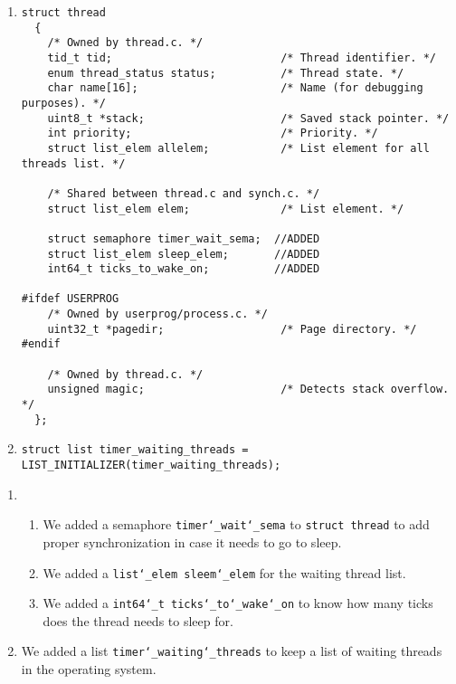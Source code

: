 \documentclass{article}
\renewcommand{\_}{\char`_}
\begin{document}
\begin{enumerate}
 \item \begin{lstlisting}
struct thread
  {
    /* Owned by thread.c. */
    tid_t tid;                          /* Thread identifier. */
    enum thread_status status;          /* Thread state. */
    char name[16];                      /* Name (for debugging purposes). */
    uint8_t *stack;                     /* Saved stack pointer. */
    int priority;                       /* Priority. */
    struct list_elem allelem;           /* List element for all threads list. */

    /* Shared between thread.c and synch.c. */
    struct list_elem elem;              /* List element. */

    struct semaphore timer_wait_sema;  //ADDED
    struct list_elem sleep_elem;       //ADDED 
    int64_t ticks_to_wake_on;          //ADDED 

#ifdef USERPROG
    /* Owned by userprog/process.c. */
    uint32_t *pagedir;                  /* Page directory. */
#endif

    /* Owned by thread.c. */
    unsigned magic;                     /* Detects stack overflow. */
  };
\end{lstlisting}

\item \begin{lstlisting}
struct list timer_waiting_threads = LIST_INITIALIZER(timer_waiting_threads);
\end{lstlisting}

\end{enumerate}

\begin{enumerate}
    \item 
    \begin{enumerate}
        \item We added a semaphore \texttt{timer\_wait\_sema} to \texttt{struct thread} to add proper synchronization in case it needs to go to sleep.
        \item We added a \texttt{list\_elem sleem\_elem} for the waiting
        thread list.
        \item We added a \texttt{int64\_t ticks\_to\_wake\_on} to know how many 
        ticks does the thread needs to sleep for.
    \end{enumerate}
    \item We added a list \texttt{timer\_waiting\_threads} to keep a list of waiting
    threads in the operating system.
\end{enumerate}
\end{document}
